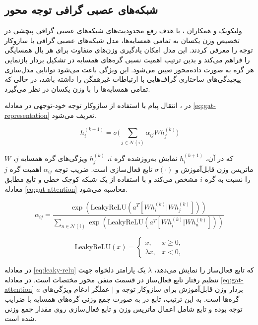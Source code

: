 \subsection{شبکه‌های عصبی گرافی توجه محور}
ولیکویک و همکاران \cite{velivckovic2017graph}، با هدف رفع محدودیت‌های شبکه‌های عصبی گرافی پیچشی در تخصیص وزن یکسان به تمامی همسایه‌ها، مدل شبکه‌های عصبی گرافی با سازوکار توجه را معرفی کردند. این مدل امکان یادگیری وزن‌های متفاوت برای هر یال همسایگی را فراهم می‌کند و بدین ترتیب اهمیت نسبی گره‌های همسایه در تشکیل بردار بازنمایی هر گره به‌ صورت داده‌محور تعیین می‌شود. این ویژگی باعث می‌شود  توانایی مدل‌سازی پیچیدگی‌های ساختاری گراف‌هایی با ارتباطات غیرهمگن را داشته باشد، در حالی که  تمامی همسایه‌ها را با وزن یکسان در نظر می‌گیرد.

در ، انتقال پیام با استفاده از سازوکار توجه خود-توجهی  در معادله \ref{eq:gat-representation} تعریف می‌شود.

\begin{equation}
	h^{(k+1)}_i = \sigma\Big(\sum_{j \in \mathcal{N}(i)} \alpha_{ij} W h^{(k)}_j \Big)
	\label{eq:gat-representation}
\end{equation}

که در آن، $h_i^{(k+1)}$ نمایش به‌روزشده گره $i$، $h^{(k)}_j$ ویژگی‌های گره همسایه $j$، $W$ ماتریس وزن قابل‌آموزش و $\sigma(\cdot)$ تابع فعال‌سازی است. ضریب توجه $\alpha_{ij}$ اهمیت گره $j$ را نسبت به گره $i$ مشخص می‌کند و با استفاده از یک شبکه کوچک خطی و تابع  مطابق معادله \ref{eq:gat-attention} محاسبه می‌شود.

\begin{equation}
	\alpha_{ij} = \frac{\exp(\mathrm{LeakyReLU}(a^T [Wh^{(k)}_i | Wh^{(k)}_j]))}{\sum_{n \in \mathcal{N}(i)} \exp(\mathrm{LeakyReLU}(a^T [Wh^{(k)}_i | Wh^{(k)}_n]))}
	\label{eq:gat-attention}
\end{equation}

\begin{equation}
	\mathrm{LeakyReLU}(x) = 
	\begin{cases}
		x, & x \ge 0, \\
		\lambda x, & x < 0,
	\end{cases}
	\label{eq:leaky-relu}
\end{equation}

در معادله \ref{eq:leaky-relu} که تابع فعال‌ساز  را نمایش می‌دهد، $\lambda$ یک پارامتر دلخواه جهت تنظیم رفتار تابع فعال‌ساز در قسمت منفی محور مختصات است.
در معادله \ref{eq:gat-attention} $a$ بردار وزن قابل‌آموزش برای سازوکار توجه و $|$ عملگر ادغام ویژگی‌های گره‌ها است. به این ترتیب، تابع  در  به صورت جمع‌ وزنی گره‌های همسایه با ضرایب توجه بوده و تابع  شامل اعمال ماتریس وزن و تابع فعال‌سازی روی مقدار جمع ‌وزنی شده است.


